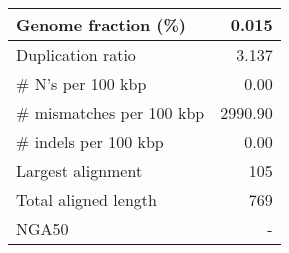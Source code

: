 \documentclass[12pt,a4paper]{article}
\begin{document}
\begin{table}[ht]
\begin{center}
\begin{tabular}{|l*{1}{|r}|}
Genome fraction (\%) & 0.015 \\ \hline
Duplication ratio & 3.137 \\ \hline
\# N's per 100 kbp & 0.00 \\ \hline
\# mismatches per 100 kbp & 2990.90 \\ \hline
\# indels per 100 kbp & 0.00 \\ \hline
Largest alignment & 105 \\ \hline
Total aligned length & 769 \\ \hline
NGA50 & - \\ \hline
\end{tabular}
\end{center}
\end{table}
\end{document}
